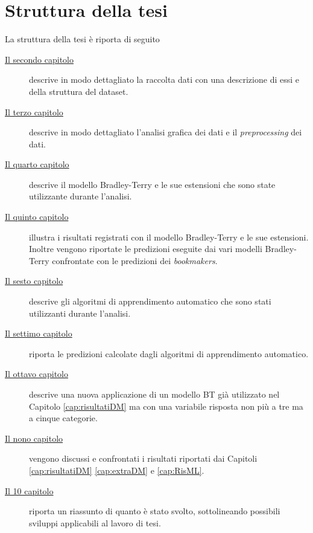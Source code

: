 \section{Struttura della tesi}
La struttura della tesi è riporta di seguito
\begin{description}

\item[{\hyperref[cap:dataset]{Il secondo capitolo}}] descrive in modo dettagliato la raccolta dati con una descrizione di essi e della struttura del dataset. 
\item[{\hyperref[cap:Analisi]{Il terzo capitolo}}] descrive in modo dettagliato l'analisi grafica dei dati e il \emph{preprocessing} dei dati. 
\item[{\hyperref[cap:BT]{Il quarto capitolo}}] descrive il modello Bradley-Terry e le sue estensioni che sono state utilizzante durante l'analisi.
\item[{\hyperref[cap:risultatiDM]{Il quinto capitolo}}] illustra i risultati registrati con il modello Bradley-Terry e le sue estensioni. Inoltre vengono riportate le predizioni eseguite dai vari modelli Bradley-Terry confrontate con le predizioni dei \emph{bookmakers}.
\item[{\hyperref[cap:ML]{Il sesto capitolo}}] descrive gli algoritmi di apprendimento automatico che sono stati utilizzanti durante l'analisi.
\item[{\hyperref[cap:RisML]{Il settimo capitolo}}] riporta le predizioni calcolate dagli algoritmi di apprendimento automatico.
\item[{\hyperref[cap:extraDM]{Il ottavo capitolo}}] descrive una nuova applicazione di un modello BT già utilizzato nel Capitolo \ref{cap:risultatiDM} ma con una variabile risposta non più a tre ma a cinque categorie.
\item[{\hyperref[cap:precls]{Il nono capitolo}}] vengono discussi e confrontati i risultati riportati dai Capitoli \ref{cap:risultatiDM} \ref{cap:extraDM} e \ref{cap:RisML}. 
\item[{\hyperref[cap:conclusioni]{Il 10 capitolo}}] riporta un riassunto di quanto è stato svolto, sottolineando possibili sviluppi applicabili al lavoro di tesi.
\end{description}





\begin{comment}
\begin{figure}[h]
	\begin{center}
		\texttt{[image: Logo\_azzurrodigite.png]}
		\caption{Logo di AzzurroDigitale}
	\end{center}
\end{figure}	contenuto...
\end{comment}



